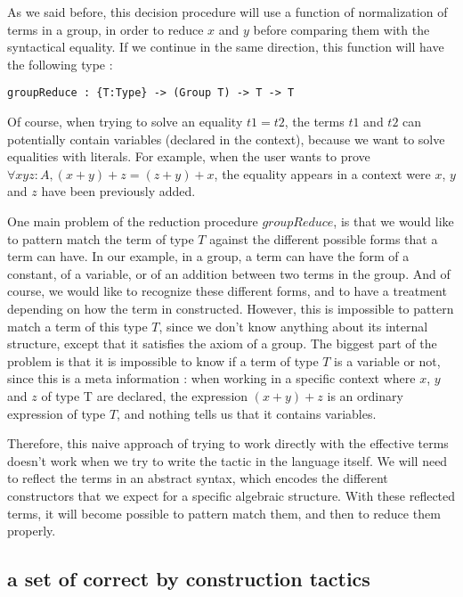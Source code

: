 As we said before, this decision procedure will use a function of normalization of terms in a group, in order to reduce $x$ and $y$ before comparing them with the syntactical equality. If we continue in the same direction, this function will have the following type :
\begin{lstlisting}[captionpos=b, label=groupReduce:haskell2, breaklines=true]
groupReduce : {T:Type} -> (Group T) -> T -> T
\end{lstlisting}	

Of course, when trying to solve an equality $t1 = t2$, the terms $t1$ and $t2$ can potentially contain variables (declared in the context), because we want to solve equalities with literals. For example, when the user wants to prove $ \forall x y z:A, (x+y) + z = (z + y) + x $, the equality appears in a context were $x$, $y$ and $z$ have been previously added. 

One main problem of the reduction procedure $groupReduce$, is that we would like to pattern match the term of type $T$ against the different possible forms that a term can have. In our example, in a group, a term can have the form of a constant, of a variable, or of an addition between two terms in the group. And of course, we would like to recognize these different forms, and to have a treatment depending on how the term in constructed. However, this is impossible to pattern match a term of this type $T$, since we don't know anything about its internal structure, except that it satisfies the axiom of a group.
The biggest part of the problem is that it is impossible to know if a term of type $T$ is a variable or not, since this is a meta information : when working in a specific context where $x$, $y$ and $z$ of type T are declared, the expression $(x+y)+z$ is an ordinary expression of type $T$, and nothing tells us that it contains variables.

Therefore, this naive approach of trying to work directly with the effective terms doesn't work when we try to write the tactic in the language itself. We will need to reflect the terms in an abstract syntax, which encodes the different constructors that we expect for a specific algebraic structure. With these reflected terms, it will become possible to pattern match them, and then to reduce them properly.

\subsection{a set of correct by construction tactics}

